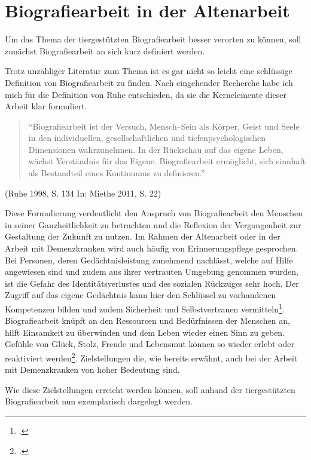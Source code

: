 \section{Biografiearbeit in der Altenarbeit}
\label{sec:k3_BiografiearbeitInDerAltenarbeit}

Um das Thema der tiergestützten Biografiearbeit besser verorten zu können, soll zunächst Biografiearbeit an sich kurz definiert werden. 

Trotz unzähliger Literatur zum Thema ist es gar nicht so leicht eine schlüssige Definition von Biografiearbeit zu finden. Nach eingehender Recherche habe ich mich für die Definition von Ruhe entschieden, da sie die Kernelemente dieser Arbeit klar formuliert.

\begin{quotation}
"`Biografiearbeit ist der Versuch, Mensch--Sein als Körper, Geist und Seele in den individuellen, gesellschaftlichen und tiefenpsychologischen Dimensionen wahrzunehmen. In der Rückschau auf das eigene Leben, wächst Verständnis für das Eigene. Biografiearbeit ermöglicht, sich sinnhaft als Bestandteil eines Kontinuums zu definieren."'
\end{quotation}

\begin{flushright}
(Ruhe 1998, S. 134 In: Miethe 2011, S. 22)
\end{flushright}

Diese Formulierung verdeutlicht den Anspruch von Biografiearbeit den Menschen in seiner Ganzheitlichkeit zu betrachten und die Reflexion der Vergangenheit zur Gestaltung der Zukunft zu nutzen.
Im Rahmen der Altenarbeit oder in der Arbeit mit Demenzkranken wird auch häufig von Erinnerungspflege gesprochen. Bei Personen, deren Gedächtnisleistung zunehmend nachlässt, welche auf Hilfe angewiesen sind und zudem aus ihrer vertrauten Umgebung genommen wurden, ist die Gefahr des Identitätsverlustes und des sozialen Rückzuges sehr hoch. Der Zugriff auf das eigene Gedächtnis kann hier den Schlüssel zu vorhandenen Kompetenzen bilden und zudem Sicherheit und Selbstvertrauen vermitteln\footcite[vgl.][25]{Giruc2011}. Biografiearbeit knüpft an den Ressourcen und Bedürfnissen der Menschen an, hilft Einsamkeit zu überwinden und dem Leben wieder einen Sinn zu geben. Gefühle von Glück, Stolz, Freude und Lebensmut können so wieder erlebt oder reaktiviert werden\footcite[vgl.][75]{Schwarz2009}. Zielstellungen die, wie bereits erwähnt, auch bei der Arbeit mit Demenzkranken von hoher Bedeutung sind. 

Wie diese Zielstellungen erreicht werden können, soll anhand der tiergestützten Biografiearbeit nun exemplarisch dargelegt werden.